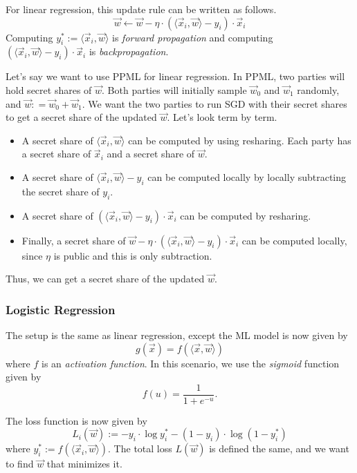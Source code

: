 For linear regression, this update rule can be written as follows.
$$\vec{w} \gets \vec{w} - \eta \cdot (\langle \vec{x}_i, \vec{w}\rangle - y_i)\cdot \vec{x}_i$$
Computing $y_i^*:= \langle \vec{x}_i, \vec{w}\rangle$ is \textit{forward propagation} and computing $(\langle \vec{x}_i, \vec{w}\rangle - y_i)\cdot \vec{x}_i$ is \textit{backpropagation}.

Let's say we want to use PPML for linear regression. In PPML, two parties will hold secret shares of $\vec{w}$. Both parties will initially sample $\vec{w}_0$ and $\vec{w}_1$ randomly, and $\vec{w}: = \vec{w}_0 + \vec{w}_1$. We want the two parties to run SGD with their secret shares to get a secret share of the updated $\vec{w}$. Let's look term by term.

\begin{itemize}
    \item A secret share of $\langle \vec{x}_i, \vec{w}\rangle$ can be computed by using resharing. Each party has a secret share of $\vec{x}_i$ and a secret share of $\vec{w}$.
    \item A secret share of $\langle \vec{x}_i, \vec{w}\rangle - y_i$ can be computed locally by locally subtracting the secret share of $y_i$.
    \item A secret share of $(\langle \vec{x}_i, \vec{w}\rangle - y_i)\cdot \vec{x}_i$ can be computed by resharing.
    \item Finally, a secret share of $\vec{w} - \eta \cdot (\langle \vec{x}_i, \vec{w}\rangle - y_i)\cdot \vec{x}_i$ can be computed locally, since $\eta$ is public and this is only subtraction.
\end{itemize}

Thus, we can get a secret share of the updated $\vec{w}$.

\subsubsection{Logistic Regression}

The setup is the same as linear regression, except the ML model is now given by
$$g(\vec{x}) = f(\langle \vec{x}, \vec{w}\rangle)$$
where $f$ is an \textit{activation function}. In this scenario, we use the \textit{sigmoid} function given by
$$f(u) = \frac{1}{1 + e^{-u}}.$$

The loss function is now given by
$$L_i(\vec{w}):= -y_i \cdot \log y_i^* - (1-y_i) \cdot \log(1-y_i^*)$$
where $y_i^* := f(\langle \vec{x}_i, \vec{w}\rangle)$. The total loss $L(\vec{w})$ is defined the same, and we want to find $\vec{w}$ that minimizes it.

